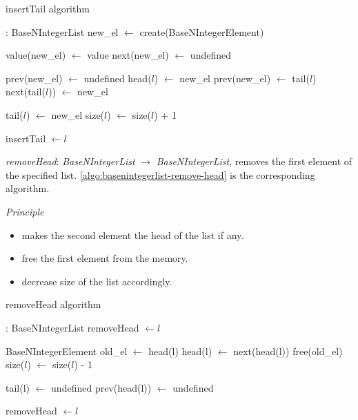 \documentclass[book, nodocumentinfo]{upmethodology-document}
\begin{document}
\begin{algorithm}[H]
    \label{algo:basenintegerlist-insert-tail}
    \caption{insertTail algorithm}

    \begin{algorithmic}
         : BaseNIntegerList
            \State new\_el \(\leftarrow\) create(BaseNIntegerElement)

            \State value(new\_el) \(\leftarrow\) value
            \State next(new\_el) \(\leftarrow\) undefined

                \State prev(new\_el) \(\leftarrow\) undefined
                \State head(\(l\)) \(\leftarrow\) new\_el
            \Else
                \State prev(new\_el) \(\leftarrow\) tail(\(l\))
                \State next(tail(\(l\))) \(\leftarrow\) new\_el
            \EndIf

            \State tail(\(l\)) \(\leftarrow\) new\_el
            \State size(\(l\)) \(\leftarrow\) size(\(l\)) + 1

            \State insertTail \(\leftarrow l\)
        \EndFunction
    \end{algorithmic}
\end{algorithm}


\emph{removeHead}: \emph{BaseNIntegerList} \(\rightarrow\) \emph{BaseNIntegerList},
removes the first element of the specified list.
\ref{algo:basenintegerlist-remove-head} is the corresponding algorithm.

\emph{Principle}
\begin{itemize}
    \item makes the second element the head of the list if any.
    \item free the first element from the memory.
    \item decrease size of the list accordingly.
\end{itemize}

\begin{algorithm}[H]
    \label{algo:basenintegerlist-remove-head}
    \caption{removeHead algorithm}

    \begin{algorithmic}
         : BaseNIntegerList
                \State removeHead \(\leftarrow l\)
            \EndIf

            \State BaseNIntegerElement old\_el \(\leftarrow\) head(l)
            \State head(l) \(\leftarrow\) next(head(l))
            \State free(old\_el)
            \State size(\(l\)) \(\leftarrow\) size(\(l\)) - 1

                \State tail(l) \(\leftarrow\) undefined
            \Else
                \State prev(head(l)) \(\leftarrow\) undefined
            \EndIf

            \State removeHead \(\leftarrow l\)
        \EndFunction
    \end{algorithmic}
\end{algorithm}
\end{document}
